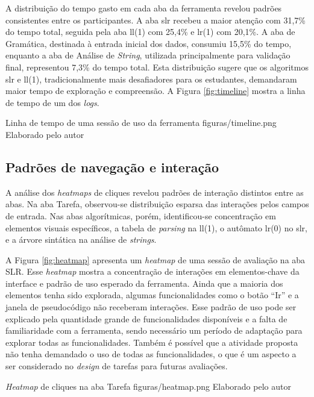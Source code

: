 A distribuição do tempo gasto em cada aba da ferramenta revelou padrões consistentes entre os participantes. A aba \gls{slr} recebeu a maior atenção com 31,7\% do tempo total, seguida pela aba \gls{ll}(1) com 25,4\% e \gls{lr}(1) com 20,1\%. A aba de Gramática, destinada à entrada inicial dos dados, consumiu 15,5\% do tempo, enquanto a aba de Análise de \textit{String}, utilizada principalmente para validação final, representou 7,3\% do tempo total. Esta distribuição sugere que os algoritmos \gls{slr} e \gls{ll}(1), tradicionalmente mais desafiadores para os estudantes, demandaram maior tempo de exploração e compreensão. A Figura \ref{fig:timeline} mostra a linha de tempo de um dos \textit{logs}.

\begin{mypicture}
	{\label{fig:timeline}}
	{Linha de tempo de uma sessão de uso da ferramenta}
	{figuras/timeline.png}
	{Elaborado pelo autor}
\end{mypicture}


\subsection{Padrões de navegação e interação}

A análise dos \textit{heatmaps} de cliques revelou padrões de interação distintos entre as abas. Na aba Tarefa, observou-se distribuição esparsa das interações pelos campos de entrada. Nas abas algorítmicas, porém, identificou-se concentração em elementos visuais específicos, a tabela de \textit{parsing} na \gls{ll}(1), o autômato \gls{lr}(0) no \gls{slr}, e a árvore sintática na análise de \textit{strings}.

A Figura \ref{fig:heatmap} apresenta um \textit{heatmap} de uma sessão de avaliação na aba SLR. Esse \textit{heatmap} mostra a concentração de interações em elementos-chave da interface e padrão de uso esperado da ferramenta. Ainda que a maioria dos elementos tenha sido explorada, algumas funcionalidades como o botão ``Ir'' e a janela de pseudocódigo não receberam interações. Esse padrão de uso pode ser explicado pela quantidade grande de funcionalidades disponíveis e a falta de familiaridade com a ferramenta, sendo necessário um período de adaptação para explorar todas as funcionalidades. Também é possível que a atividade proposta não tenha demandado o uso de todas as funcionalidades, o que é um aspecto a ser considerado no \textit{design} de tarefas para futuras avaliações.

\begin{mypicture}	{\label{fig:heatmap}}
	{\textit{Heatmap} de cliques na aba Tarefa}
	{figuras/heatmap.png}
	{Elaborado pelo autor}
\end{mypicture}

